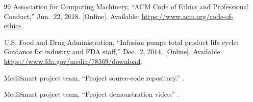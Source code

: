 \begin{thebibliography}{99}
Association for Computing Machinery, ``ACM Code of Ethics and Professional Conduct,'' Jun.~22, 2018. [Online]. Available: \url{https://www.acm.org/code-of-ethics}.

U.S. Food and Drug Administration, ``Infusion pumps total product life cycle: Guidance for industry and FDA staff,'' Dec.~2, 2014. [Online]. Available: \url{https://www.fda.gov/media/78369/download}.

MediSmart project team, ``Project source-code repository.'' \ProjectGithub.

MediSmart project team, ``Project demonstration video.'' \ProjectYoutube.
\end{thebibliography}
